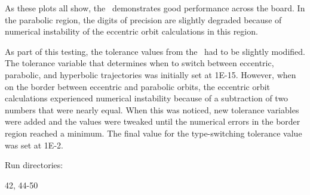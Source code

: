 \begin{description}
As these plots all show, the \OrbitalElement\ demonstrates good
performance across the board.  In the parabolic region, the digits of
precision are slightly degraded because of numerical instability of the
eccentric orbit calculations in this region.

As part of this testing, the tolerance values from the \OrbitalElement\ had to be
slightly modified.  The tolerance variable that determines when to switch
between eccentric, parabolic, and hyperbolic trajectories was initially
set at 1E-15.  However, when on the border between eccentric and parabolic
orbits, the eccentric orbit calculations experienced numerical instability
because of a subtraction of two numbers that were nearly equal.  When this was
noticed, new tolerance variables were added and the values were tweaked until
the numerical errors in the border region reached a minimum.  The final value
for the type-switching tolerance value was set at 1E-2.

Run directories:

42, 44-50

\end{description}

